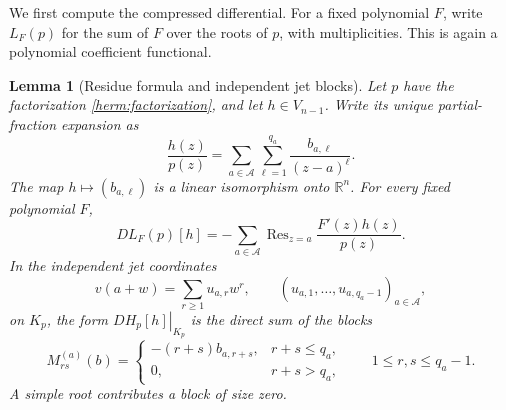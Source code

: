 \documentclass[reqno]{amsart}
\newtheorem{lemma}[theorem]{Lemma}
\theoremstyle{definition}
\theoremstyle{remark}
\newcommand{\R}{\mathbb R}
\begin{document}
We first compute the compressed differential.  For a fixed polynomial
$F$, write $L_F(p)$ for the sum of $F$ over the roots of $p$, with
multiplicities.  This is again a polynomial coefficient functional.

\begin{lemma}[Residue formula and independent jet blocks]
\label{herm:jet-blocks}
Let $p$ have the factorization \eqref{herm:factorization}, and let
$h\in V_{n-1}$.  Write its unique partial-fraction expansion as
\begin{equation}
 \frac{h(z)}{p(z)}=
       \sum_{a\in\mathcal A}\sum_{\ell=1}^{q_a}
          \frac{b_{a,\ell}}{(z-a)^\ell}.
 \label{herm:principal-parts}
\end{equation}
The map $h\mapsto(b_{a,\ell})$ is a linear isomorphism onto $\R^n$.
For every fixed polynomial $F$,
\begin{equation}
 DL_F(p)[h]=
       -\sum_{a\in\mathcal A}
         \operatorname{Res}_{z=a}\frac{F'(z)h(z)}{p(z)}.
 \label{herm:residue}
\end{equation}
In the independent jet coordinates
\begin{equation}
 v(a+w)=\sum_{r\geq1}u_{a,r}w^r,
 \qquad
 (u_{a,1},\ldots,u_{a,q_a-1})_{a\in\mathcal A},
 \label{herm:jet-coordinates}
\end{equation}
on $K_p$, the form $\left.DH_p[h]\right|_{K_p}$ is the direct sum of
the blocks
\begin{equation}
 M^{(a)}_{rs}(b)=
 \begin{cases}
       -(r+s)b_{a,r+s},&r+s\leq q_a,\\
       0,&r+s>q_a,
 \end{cases}
 \qquad 1\leq r,s\leq q_a-1.
 \label{herm:blocks}
\end{equation}
A simple root contributes a block of size zero.
\end{lemma}
\end{document}
